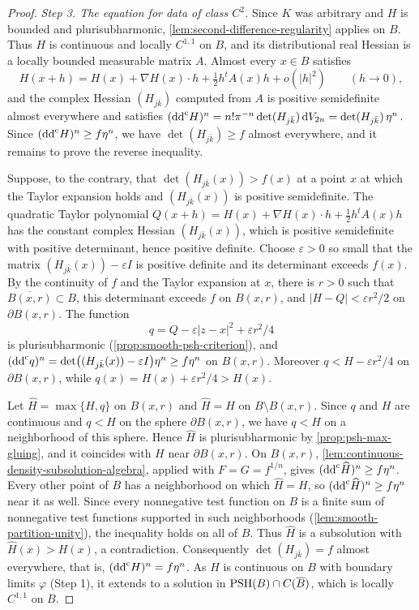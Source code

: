 \begin{proof}
\emph{Step 3. The equation for data of class $C^2$.}
Since $K$ was arbitrary and $H$ is bounded and plurisubharmonic, \cref{lem:second-difference-regularity} applies on $B$. Thus $H$ is continuous and locally $C^{1,1}$ on $B$, and its distributional real Hessian is a locally bounded measurable matrix $A$. Almost every $x\in B$ satisfies
\[
 H(x+h)=H(x)+\nabla H(x)\cdot h+\tfrac12h^tA(x)h+o(|h|^2)\qquad(h\to0),
\]
and the complex Hessian $(H_{j\bar k})$ computed from $A$ is positive semidefinite almost everywhere and satisfies $(\mathrm{dd}^{\mathrm{c}} H)^n=n!\pi^{-n}\det(H_{j\bar k})\,\mathrm dV_{2n}=\det(H_{j\bar k})\,\eta^n$. Since $(\mathrm{dd}^{\mathrm{c}} H)^n\ge f\eta^n$, we have $\det(H_{j\bar k})\ge f$ almost everywhere, and it remains to prove the reverse inequality.

Suppose, to the contrary, that $\det(H_{j\bar k}(x))>f(x)$ at a point $x$ at which the Taylor expansion holds and $(H_{j\bar k}(x))$ is positive semidefinite. The quadratic Taylor polynomial $Q(x+h)=H(x)+\nabla H(x)\cdot h+\frac12h^tA(x)h$ has the constant complex Hessian $(H_{j\bar k}(x))$, which is positive semidefinite with positive determinant, hence positive definite. Choose $\varepsilon>0$ so small that the matrix $(H_{j\bar k}(x))-\varepsilon I$ is positive definite and its determinant exceeds $f(x)$. By the continuity of $f$ and the Taylor expansion at $x$, there is $r>0$ such that $\overline{B(x,r)}\subset B$, this determinant exceeds $f$ on $B(x,r)$, and $|H-Q|<\varepsilon r^2/2$ on $\partial B(x,r)$. The function
\[
 q=Q-\varepsilon|z-x|^2+\varepsilon r^2/4
\]
is plurisubharmonic (\cref{prop:smooth-psh-criterion}), and $(\mathrm{dd}^{\mathrm{c}} q)^n=\det\bigl((H_{j\bar k}(x))-\varepsilon I\bigr)\eta^n\ge f\eta^n$ on $B(x,r)$. Moreover $q<H-\varepsilon r^2/4$ on $\partial B(x,r)$, while $q(x)=H(x)+\varepsilon r^2/4>H(x)$.

Let $\widehat H=\max\{H,q\}$ on $B(x,r)$ and $\widehat H=H$ on $B\setminus B(x,r)$. Since $q$ and $H$ are continuous and $q<H$ on the sphere $\partial B(x,r)$, we have $q<H$ on a neighborhood of this sphere. Hence $\widehat H$ is plurisubharmonic by \cref{prop:psh-max-gluing}, and it coincides with $H$ near $\partial B(x,r)$. On $B(x,r)$, \cref{lem:continuous-density-subsolution-algebra}, applied with $F=G=f^{1/n}$, gives $(\mathrm{dd}^{\mathrm{c}}\widehat H)^n\ge f\eta^n$. Every other point of $B$ has a neighborhood on which $\widehat H=H$, so $(\mathrm{dd}^{\mathrm{c}}\widehat H)^n\ge f\eta^n$ near it as well. Since every nonnegative test function on $B$ is a finite sum of nonnegative test functions supported in such neighborhoods (\cref{lem:smooth-partition-unity}), the inequality holds on all of $B$. Thus $\widehat H$ is a subsolution with $\widehat H(x)>H(x)$, a contradiction. Consequently $\det(H_{j\bar k})=f$ almost everywhere, that is, $(\mathrm{dd}^{\mathrm{c}} H)^n=f\eta^n$. As $H$ is continuous on $B$ with boundary limits $\varphi$ (Step 1), it extends to a solution in $\mathrm{PSH}(B)\cap C(\overline B)$, which is locally $C^{1,1}$ on $B$.


\end{proof}
